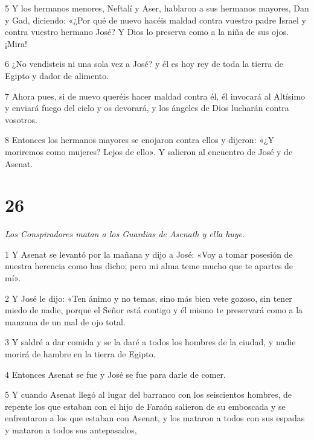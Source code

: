 \par 5 Y los hermanos menores, Neftalí y Aser, hablaron a sus hermanos mayores, Dan y Gad, diciendo: «¿Por qué de nuevo hacéis maldad contra vuestro padre Israel y contra vuestro hermano José? Y Dios lo preserva como a la niña de sus ojos. ¡Mira!

\par 6 ¿No vendisteis ni una sola vez a José? y él es hoy rey ​​de toda la tierra de Egipto y dador de alimento.

\par 7 Ahora pues, si de nuevo queréis hacer maldad contra él, él invocará al Altísimo y enviará fuego del cielo y os devorará, y los ángeles de Dios lucharán contra vosotros.

\par 8 Entonces los hermanos mayores se enojaron contra ellos y dijeron: «¿Y moriremos como mujeres? Lejos de ello». Y salieron al encuentro de José y de Asenat.

\chapter{26}

\par \textit{Los Conspiradores matan a los Guardias de Asenath y ella huye.}


\par 1 Y Asenat se levantó por la mañana y dijo a José: «Voy a tomar posesión de nuestra herencia como has dicho; pero mi alma teme mucho que te apartes de mí».

\par 2 Y José le dijo: «Ten ánimo y no temas, sino más bien vete gozoso, sin tener miedo de nadie, porque el Señor está contigo y él mismo te preservará como a la manzana de un mal de ojo total.

\par 3 Y saldré a dar comida y se la daré a todos los hombres de la ciudad, y nadie morirá de hambre en la tierra de Egipto.

\par 4 Entonces Asenat se fue y José se fue para darle de comer.

\par 5 Y cuando Asenat llegó al lugar del barranco con los seiscientos hombres, de repente los que estaban con el hijo de Faraón salieron de su emboscada y se enfrentaron a los que estaban con Asenat, y los mataron a todos con sus espadas y mataron a todos sus antepasados,

